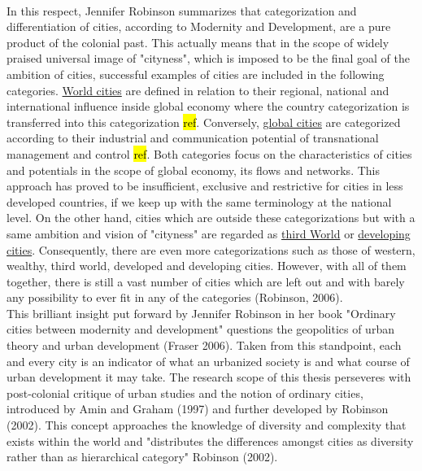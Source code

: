 \documentclass[11pt]{report}
\begin{document}
\\
In  this  respect,  Jennifer  Robinson  summarizes  that  categorization  and  differentiation  of  cities, according to Modernity and Development, are a pure product of the colonial past. This actually means that in the scope of widely praised universal image of "cityness", which is imposed to be the final goal of the ambition of cities, successful examples of cities are included in the following categories. \underline{World cities} are defined in relation to their regional, national and international influence inside global economy where the country categorization is transferred into this categorization \hl{ref}. Conversely, \underline{global cities} are categorized according to their industrial and communication potential of transnational management and control \hl{ref}. Both categories focus on the characteristics of cities and potentials in the scope of global economy, its flows and networks. This approach has proved to be insufficient, exclusive and restrictive for cities in less developed countries, if we keep up with the same terminology at the national level. On the other hand, cities which are outside these categorizations but with a same ambition and vision of "cityness" are regarded as \underline{third World} or \underline{developing cities}. Consequently, there are even more categorizations such as those of western, wealthy, third world, developed and developing cities. However, with all of them together, there is still a vast number of cities which are left out and with barely any possibility to ever fit in any of the categories (Robinson, 2006). 
\\
This brilliant insight put forward by Jennifer Robinson in her book "Ordinary cities between modernity and development" questions the geopolitics of urban theory and urban development (Fraser 2006). Taken from this standpoint, each and every city is an indicator of what an urbanized society is and what course of urban development it may take. The research scope of this thesis perseveres with post-colonial critique of urban studies and the notion of ordinary cities, introduced by Amin and Graham (1997) and further developed by Robinson (2002). This concept approaches the knowledge of diversity and complexity that exists within the world and "distributes the differences amongst cities as diversity rather than as hierarchical category" Robinson (2002). 
\\
\end{document}
